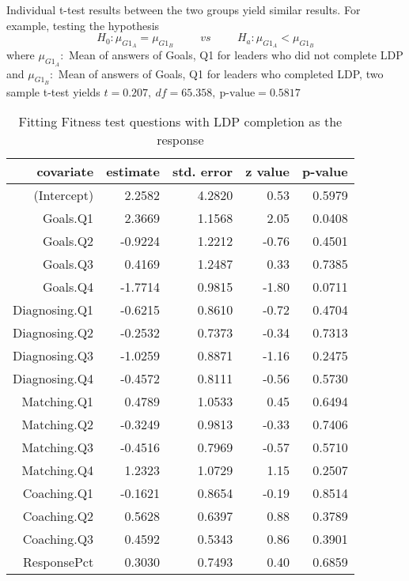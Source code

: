 \documentclass[11pt]{extarticle} %
\begin{document}
Individual t-test results between the two groups yield similar results. For example, testing the hypothesis
$$H_0: \mu_{G1_A} = \mu_{G1_B} \hspace{1cm} vs \hspace{1cm} H_a: \mu_{G1_A} < \mu_{G1_B}$$ where $\mu_{G1_A}:$ Mean of answers of Goals, Q1 for leaders who did not complete LDP and $\mu_{G1_B}:$ Mean of answers of Goals, Q1 for leaders who completed LDP, two sample t-test yields 
$t = 0.207, \ df = 65.358, \ \text{p-value} = 0.5817$

\begin{table}[H]
\centering
\begin{tabular}{rrrrr}
  \hline
  covariate	& estimate & std. error & z value & p-value \\ 
  \hline
  (Intercept) 	& 2.2582  & 4.2820 & 0.53  & 0.5979 \\ 
  Goals.Q1 	& 2.3669  & 1.1568 & 2.05  & 0.0408 \\ 
  Goals.Q2 	& -0.9224 & 1.2212 & -0.76 & 0.4501 \\ 
  Goals.Q3 	& 0.4169  & 1.2487 & 0.33  & 0.7385 \\ 
  Goals.Q4 	& -1.7714 & 0.9815 & -1.80 & 0.0711 \\ 
  Diagnosing.Q1 & -0.6215 & 0.8610 & -0.72 & 0.4704 \\ 
  Diagnosing.Q2 & -0.2532 & 0.7373 & -0.34 & 0.7313 \\ 
  Diagnosing.Q3 & -1.0259 & 0.8871 & -1.16 & 0.2475 \\ 
  Diagnosing.Q4 & -0.4572 & 0.8111 & -0.56 & 0.5730 \\ 
  Matching.Q1 	& 0.4789  & 1.0533 & 0.45  & 0.6494 \\ 
  Matching.Q2 	& -0.3249 & 0.9813 & -0.33 & 0.7406 \\ 
  Matching.Q3 	& -0.4516 & 0.7969 & -0.57 & 0.5710 \\ 
  Matching.Q4 	& 1.2323  & 1.0729 & 1.15  & 0.2507 \\ 
  Coaching.Q1 	& -0.1621 & 0.8654 & -0.19 & 0.8514 \\ 
  Coaching.Q2 	& 0.5628  & 0.6397 & 0.88  & 0.3789 \\ 
  Coaching.Q3 	& 0.4592  & 0.5343 & 0.86  & 0.3901 \\ 
  ResponsePct 	& 0.3030  & 0.7493 & 0.40  & 0.6859 \\ 
  \hline
\end{tabular}
\caption{Fitting Fitness test questions with LDP completion as the response}
\end{table}
\end{document}
